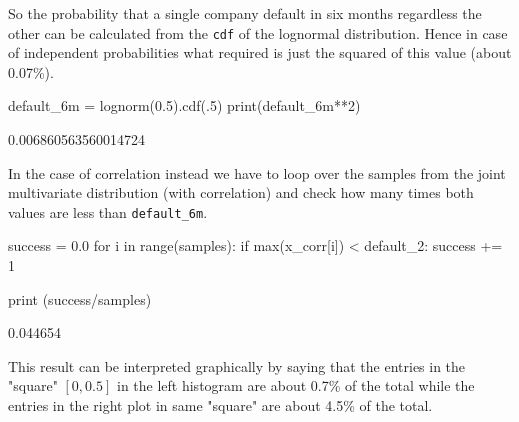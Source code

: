 \begin{solution}
So the probability that a single company default in six months regardless the other can be calculated from the \texttt{cdf} of the lognormal distribution.
Hence in case of independent probabilities what required is just the squared of this value (about 0.07\%).

\begin{ipython}
default_6m = lognorm(0.5).cdf(.5)
print(default_6m**2)
\end{ipython}
\begin{ioutput}
0.006860563560014724
\end{ioutput}

In the case of correlation instead we have to loop over the samples from the joint multivariate distribution (with correlation) and check how many times both values are less than \texttt{default\_6m}.

\begin{ipython}
success = 0.0
for i in range(samples):
    if max(x_corr[i]) < default_2:
        success += 1

print (success/samples)
\end{ipython}
\begin{ioutput}
0.044654
\end{ioutput}

This result can be interpreted graphically by saying that the entries in the "square" $[0, 0.5]$ in the left histogram are about 0.7\% of the total while the entries in the right plot in same "square" are about 4.5\% of the total. 
\end{solution}
